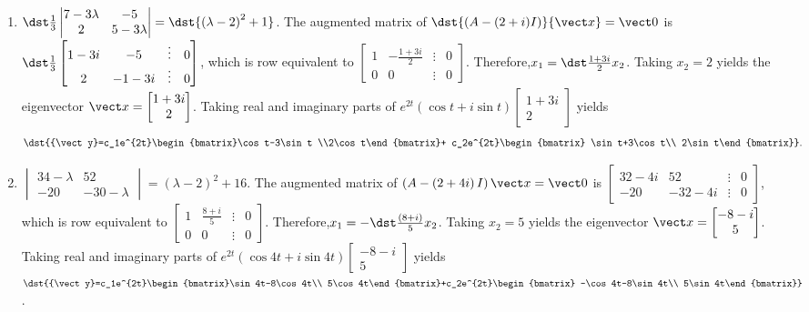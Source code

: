 \documentclass[openany]{book}
\newenvironment{sectionSolutions}{
 \begin{enumerate}[item-label={\thesection.\arabic{enumi}.}]
}{
 \end{enumerate}
}
\begin{document}
\begin{sectionSolutions}
\item
$\dst\frac{1}{3}\begin{vmatrix}7-3\lambda&-5\\2&5-3\lambda
\end{vmatrix}=\dst{\left(\lambda-2\right)^2+1}$.
The augmented matrix of
$\dst{\left(A-(2+i)I\right)}{\vect x}={\vect 0}$ is
$\dst\frac{1}{3}\begin{bmatrix}1-3i&-5&\vdots&0\\2&-1-3i&\vdots&0
\end{bmatrix}$, which is row equivalent to
$\begin{bmatrix} 1&-\frac{1+3i}{2}&\vdots&0\\ 0&0&\vdots&0
\end{bmatrix}$. Therefore,$x_1=\dst\frac{1+3i}{2}x_2$. Taking
$x_2=2$ yields the eigenvector
${\vect x}=\begin{bmatrix}1+3i\\2\end{bmatrix}$.
 Taking real and imaginary parts of
$e^{2t}(\cos t+i\sin t)
\begin{bmatrix}1+3i\\2\end{bmatrix}$
yields
\[
\dst{{\vect y}=c_1e^{2t}\begin{bmatrix}\cos t-3\sin t
\\2\cos t\end{bmatrix}+
c_2e^{2t}\begin{bmatrix}
\sin t+3\cos t\\ 2\sin t\end{bmatrix}}.
\]


\item
$\begin{vmatrix}34-\lambda&52\\-20&-30-\lambda
\end{vmatrix}=(\lambda-2)^2+16$. The augmented matrix of
$\left(A-\left(2+4i\right)I\right){\vect x}={\vect 0}$ is
$\begin{bmatrix}32-4i&52&\vdots&0\\-20&-32-4i&\vdots&0
\end{bmatrix}$, which is row equivalent to
$\begin{bmatrix} 1&\frac{8+i}{5}&\vdots&0\\ 0&0&\vdots&0
\end{bmatrix}$. Therefore,$x_1=-\dst\frac{(8+i)}{5}x_2$. Taking
$x_2=5$ yields the eigenvector ${\vect
x}=\begin{bmatrix}-8-i\\5\end{bmatrix}$.
Taking real and imaginary parts of $e^{2t}(\cos4t+i\sin
4t)\begin{bmatrix}-8-i\\5\end{bmatrix}$ yields $\dst{{\vect
y}=c_1e^{2t}\begin{bmatrix}\sin4t-8\cos4t\\
5\cos4t\end{bmatrix}+c_2e^{2t}\begin{bmatrix}
-\cos4t-8\sin4t\\ 5\sin4t\end{bmatrix}}$.



\end{sectionSolutions}
\end{document}
